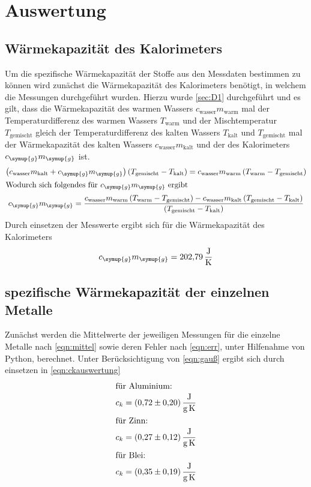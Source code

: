 \section{Auswertung}
\label{sec:Auswertung}
\subsection{Wärmekapazität des Kalorimeters}
Um die spezifische Wärmekapazität der Stoffe aus den Messdaten bestimmen
zu können wird zunächst die Wärmekapazität des Kalorimeters benötigt,
in welchem die Messungen durchgeführt wurden. Hierzu wurde \ref{sec:D1}
durchgeführt und es gilt, dass die Wärmekapazität des warmen Wassers
$c_\text{wasser}m_\text{warm}$ mal der Temperaturdifferenz des warmen Wassers
$T_\text{warm}$ und der Mischtemperatur $T_\text{gemischt}$ gleich der
Temperaturdifferenz des kalten Wassers $T_\text{kalt}$ und $T_\text{gemischt}$
mal der Wärmekapazität des kalten Wassers $c_\text{wasser}m_\text{kalt}$
und der des Kalorimeters $c_\symup{g}m_\symup{g}$ ist.
\begin{gather}
  \left(c_\text{wasser}m_\text{kalt}+c_\symup{g}m_\symup{g}\right)
  \left(T_\text{gemischt}-T_\text{kalt}\right)
  = c_\text{wasser}m_\text{warm}\left(T_\text{warm}-T_\text{gemischt}\right)\\
  \intertext{Wodurch sich folgendes für $c_\symup{g}m_\symup{g}$ ergibt}
  c_\symup{g}m_\symup{g} = \frac
  {c_\text{wasser}m_\text{warm}\left(T_\text{warm}-T_\text{gemischt}\right)
  -c_\text{wasser}m_\text{kalt}\left(T_\text{gemischt}-T_\text{kalt}\right)}
  {\left(T_\text{gemischt}-T_\text{kalt}\right)}
\end{gather}
Durch einsetzen der Messwerte ergibt sich für die Wärmekapazität des
Kalorimeters
\begin{equation*}
  c_\symup{g}m_\symup{g} = \SI{202,79}{\joule\per\kelvin}
\end{equation*}

\subsection{spezifische Wärmekapazität der einzelnen Metalle}
Zunächst werden die Mittelwerte der jeweiligen Messungen für die
einzelne Metalle nach \eqref{eqn:mittel} sowie deren Fehler nach \eqref{eqn:err}, unter Hilfenahme von
Python, berechnet.
Unter Berücksichtigung von \eqref{eqn:gauß} ergibt sich durch einsetzen
in \eqref{eqn:ckauswertung}
\begin{gather*}
  \intertext{für Aluminium:}
  c_k =\SI{0,72(20)}{\joule\per\gram\per\kelvin}\\
  \intertext{für Zinn:}
  c_k =\SI{0,27(12)}{\joule\per\gram\per\kelvin}\\
  \intertext{für Blei:}
  c_k =\SI{0,35(19)}{\joule\per\gram\per\kelvin}
\end{gather*}

